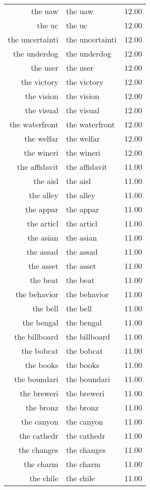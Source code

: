 \begin{table}[ht]
\begin{tabular}{rlr}
  the uaw & the uaw & 12.00 \\ 
  the uc & the uc & 12.00 \\ 
  the uncertainti & the uncertainti & 12.00 \\ 
  the underdog & the underdog & 12.00 \\ 
  the user & the user & 12.00 \\ 
  the victory & the victory & 12.00 \\ 
  the vision & the vision & 12.00 \\ 
  the visual & the visual & 12.00 \\ 
  the waterfront & the waterfront & 12.00 \\ 
  the welfar & the welfar & 12.00 \\ 
  the wineri & the wineri & 12.00 \\ 
  the affidavit & the affidavit & 11.00 \\ 
  the aisl & the aisl & 11.00 \\ 
  the alley & the alley & 11.00 \\ 
  the appar & the appar & 11.00 \\ 
  the articl & the articl & 11.00 \\ 
  the asian & the asian & 11.00 \\ 
  the assad & the assad & 11.00 \\ 
  the asset & the asset & 11.00 \\ 
  the beat & the beat & 11.00 \\ 
  the behavior & the behavior & 11.00 \\ 
  the bell & the bell & 11.00 \\ 
  the bengal & the bengal & 11.00 \\ 
  the billboard & the billboard & 11.00 \\ 
  the bobcat & the bobcat & 11.00 \\ 
  the books & the books & 11.00 \\ 
  the boundari & the boundari & 11.00 \\ 
  the breweri & the breweri & 11.00 \\ 
  the bronz & the bronz & 11.00 \\ 
  the canyon & the canyon & 11.00 \\ 
  the cathedr & the cathedr & 11.00 \\ 
  the changes & the changes & 11.00 \\ 
  the charm & the charm & 11.00 \\ 
  the chile & the chile & 11.00 \\ 

\end{tabular}
\end{table}

